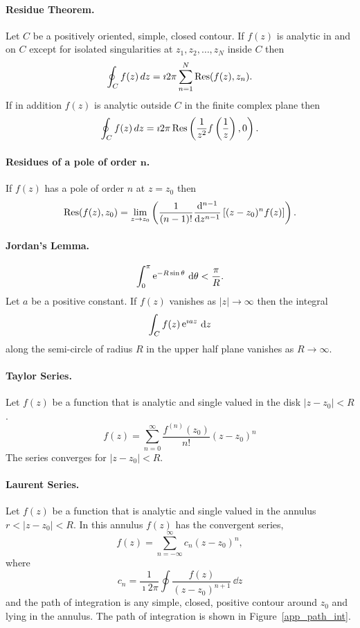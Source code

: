 \paragraph{Residue Theorem.}
Let $C$ be a positively oriented, simple, closed contour.  If $f(z)$ is
analytic in and on $C$ except for isolated singularities at $z_1, z_2, \ldots,
z_N$ inside $C$ then
\[ 
\oint_C f(z)\,dz = \imath 2 \pi \sum_{n=1}^N \mathop{\mathrm{Res}}\nolimits(f(z),z_n).
\]
If in addition $f(z)$ is analytic outside $C$ in the finite complex plane
then
\[ 
\oint_C f(z)\,dz = \imath 2 \pi \mathop{\mathrm{Res}}\nolimits\left( \frac{1}{z^2} f\left( \frac{1}{z} \right),
  0\right).
\]



\paragraph{Residues of a pole of order $\mathbf{n}$.}
If $f(z)$ has a pole of order $n$ at $z=z_0$ then 
\[ 
\mathop{\mathrm{Res}}\nolimits(f(z),z_0) = \lim_{z \to z_0} \left( \frac{1}{(n-1)!} 
  \frac{\mathrm{d}^{n-1}}{\mathrm{d} z^{n-1}} \left[ (z-z_0)^n f(z) \right] \right). 
\]


\paragraph{Jordan's Lemma.}
\[ 
\int_0^\pi \mathop{\mathrm{e}}\nolimits^{-R \sin \theta}\,\mathrm{d} \theta < \frac{\pi}{R}.
\]
Let $a$ be a positive constant.
If $f(z)$ vanishes as $|z| \to \infty$ then the integral
\[
\int_C f(z) \mathop{\mathrm{e}}\nolimits^{\imath a z} \,\mathrm{d} z
\]
along the semi-circle of radius $R$ in the upper half plane vanishes
as $R \to \infty$.


\paragraph{Taylor Series.}
Let $f(z)$ be a function that is analytic and single valued
in the disk $|z-z_0| < R$.  
\[ 
f(z) = \sum_{n = 0}^\infty \frac{f^{(n)}(z_0)}{n!} (z-z_0)^n
\]
The series converges for $|z-z_0| < R$.


\paragraph{Laurent Series.}
Let $f(z)$ be a function that is analytic and single valued
in the annulus $r < |z-z_0| < R$.
In this annulus $f(z)$ has the convergent series,
\[ 
f(z) = \sum_{n = -\infty}^\infty c_n (z-z_0)^n, 
\]
where
\[ 
c_n = \frac{1}{\imath 2 \pi} \oint \frac{f(z)}{(z-z_0)^{n+1}}\,\dd z 
\]
and the path of integration is any simple, closed, positive contour around
$z_0$ and lying in the annulus.  The path of integration is shown
in Figure~\ref{app_path_int}.


